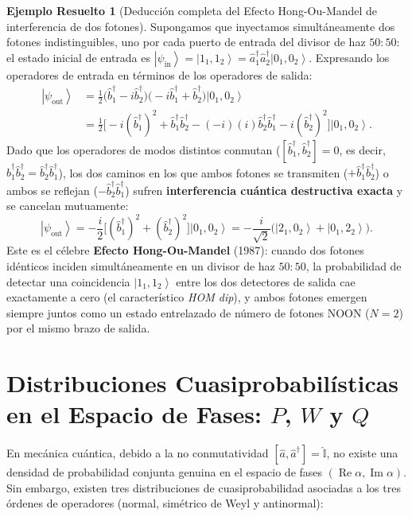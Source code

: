 \documentclass[11pt,a4paper,twoside]{report}
\theoremstyle{definition}
\newtheorem{ejemplo}{Ejemplo Resuelto}[chapter]
\theoremstyle{plain}
\theoremstyle{remark}
\newcommand{\ket}[1]{\left| #1 \right\rangle}
\newcommand{\comm}[2]{\left[ #1, #2 \right]}
\newcommand{\op}[1]{\hat{#1}}
\newcommand{\ident}{\hat{\mathbb{I}}}
\begin{document}
\begin{ejemplo}[Deducción completa del Efecto Hong-Ou-Mandel de interferencia de dos fotones]
Supongamos que inyectamos simultáneamente dos fotones indistinguibles, uno por cada puerto de entrada del divisor de haz $50:50$: el estado inicial de entrada es $\ket{\psi_{\text{in}}} = \ket{1_1, 1_2} = \op{a}_1^\dagger \op{a}_2^\dagger \ket{0_1, 0_2}$. Expresando los operadores de entrada en términos de los operadores de salida:
\begin{align}
    \ket{\psi_{\text{out}}} &= \frac{1}{2}\big(\op{b}_1^\dagger - i\op{b}_2^\dagger\big)\big(-i\op{b}_1^\dagger + \op{b}_2^\dagger\big)\ket{0_1, 0_2} \nonumber \\
    &= \frac{1}{2}\Big[ -i(\op{b}_1^\dagger)^2 + \op{b}_1^\dagger\op{b}_2^\dagger - (-i)(i)\op{b}_2^\dagger\op{b}_1^\dagger - i(\op{b}_2^\dagger)^2 \Big]\ket{0_1, 0_2}.
\end{align}
Dado que los operadores de modos distintos conmutan ($\comm{\op{b}_1^\dagger}{\op{b}_2^\dagger} = 0$, es decir, $\op{b}_1^\dagger\op{b}_2^\dagger = \op{b}_2^\dagger\op{b}_1^\dagger$), los dos caminos en los que ambos fotones se transmiten ($+\op{b}_1^\dagger\op{b}_2^\dagger$) o ambos se reflejan ($-\op{b}_2^\dagger\op{b}_1^\dagger$) sufren \textbf{interferencia cuántica destructiva exacta} y se cancelan mutuamente:
\begin{equation}
    \ket{\psi_{\text{out}}} = -\frac{i}{2}\Big[ (\op{b}_1^\dagger)^2 + (\op{b}_2^\dagger)^2 \Big]\ket{0_1, 0_2} = -\frac{i}{\sqrt{2}}\big(\ket{2_1, 0_2} + \ket{0_1, 2_2}\big).
\end{equation}
Este es el célebre \textbf{Efecto Hong-Ou-Mandel} (1987): cuando dos fotones idénticos inciden simultáneamente en un divisor de haz $50:50$, la probabilidad de detectar una coincidencia $\ket{1_1, 1_2}$ entre los dos detectores de salida cae exactamente a cero (el característico \textit{HOM dip}), y ambos fotones emergen siempre juntos como un estado entrelazado de número de fotones NOON ($N=2$) por el mismo brazo de salida.
\end{ejemplo}

\section{\texorpdfstring{Distribuciones Cuasiprobabilísticas en el Espacio de Fases: $P$, $W$ y $Q$}{Distribuciones Cuasiprobabilísticas en el Espacio de Fases: P, W y Q}}

En mecánica cuántica, debido a la no conmutatividad $\comm{\op{a}}{\op{a}^\dagger} = \ident$, no existe una densidad de probabilidad conjunta genuina en el espacio de fases $(\operatorname{Re}\alpha, \operatorname{Im}\alpha)$. Sin embargo, existen tres distribuciones de cuasiprobabilidad asociadas a los tres órdenes de operadores (normal, simétrico de Weyl y antinormal):
\end{document}
